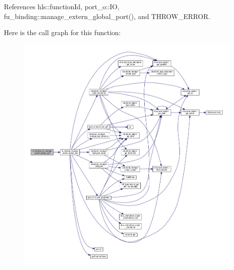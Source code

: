 References hls\+::function\+Id, port\+\_\+o\+::\+IO, fu\+\_\+binding\+::manage\+\_\+extern\+\_\+global\+\_\+port(), and T\+H\+R\+O\+W\+\_\+\+E\+R\+R\+OR.

Here is the call graph for this function\+:
\nopagebreak
\begin{figure}[H]
\begin{center}
\leavevmode
\includegraphics[width=350pt]{d4/d7b/classfu__binding__cs_a2c94fa860b8c7ca4d4bac3c107faa957_cgraph}
\end{center}
\end{figure}
\mbox{\label{classfu__binding__cs_afaba387982e2d00b6269055728c53cfd}} 
